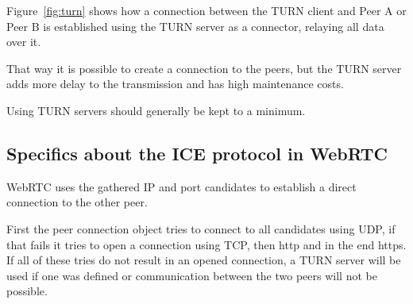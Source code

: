 \documentclass[../../../thesis.tex]{subfiles}
\begin{document}
\noindent
Figure~\ref{fig:turn} shows how a connection between the TURN client and Peer A or Peer B is established using the TURN server as a connector, relaying all data over it.\par
That way it is possible to create a connection to the peers, but the TURN server adds more delay to the transmission and has high maintenance costs. \par
Using TURN servers should generally be kept to a minimum.

\subsection{Specifics about the ICE protocol in WebRTC}
WebRTC uses the gathered IP and port candidates to establish a direct connection to the other peer.\par
First the peer connection object tries to connect to all candidates using UDP, if that fails it tries to open a connection using TCP, then http and in the end https\cite[chapter 18]{Grigorik.2013}.\\

\noindent
If all of these tries do not result in an opened connection, a TURN server will be used if one was defined or communication between the two peers will not be possible.
\end{document}
